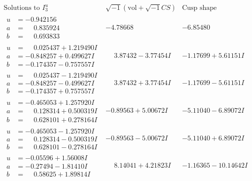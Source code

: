 \documentclass[1p]{elsarticle_modified}
\theoremstyle{definition}
\newcommand{\I}{\sqrt{-1}}
\begin{document}
$$\begin{array}{c|c|c}  
\text{Solutions to }I^u_{3}& \I (\text{vol} + \sqrt{-1}CS) & \text{Cusp shape}\\
 \hline 
\begin{aligned}
u &= -0.942156\phantom{ +0.000000I} \\
a &= \phantom{-}0.835924\phantom{ +0.000000I} \\
b &= \phantom{-}0.693833\phantom{ +0.000000I}\end{aligned}
 & -4.78668\phantom{ +0.000000I} & -6.85480\phantom{ +0.000000I} \\ \hline\begin{aligned}
u &= \phantom{-}0.025437 + 1.219490 I \\
a &= -0.848257 + 0.499627 I \\
b &= -0.174357 - 0.757557 I\end{aligned}
 & \phantom{-}3.87432 - 3.77454 I & -1.17699 + 5.61151 I \\ \hline\begin{aligned}
u &= \phantom{-}0.025437 - 1.219490 I \\
a &= -0.848257 - 0.499627 I \\
b &= -0.174357 + 0.757557 I\end{aligned}
 & \phantom{-}3.87432 + 3.77454 I & -1.17699 - 5.61151 I \\ \hline\begin{aligned}
u &= -0.465053 + 1.257920 I \\
a &= \phantom{-}0.128314 + 0.500319 I \\
b &= \phantom{-}0.628101 + 0.278164 I\end{aligned}
 & -0.89563 + 5.00672 I & -5.11040 - 6.89072 I \\ \hline\begin{aligned}
u &= -0.465053 - 1.257920 I \\
a &= \phantom{-}0.128314 - 0.500319 I \\
b &= \phantom{-}0.628101 - 0.278164 I\end{aligned}
 & -0.89563 - 5.00672 I & -5.11040 + 6.89072 I \\ \hline\begin{aligned}
u &= -0.05596 + 1.56008 I \\
a &= -0.27494 - 1.81410 I \\
b &= \phantom{-}0.58625 + 1.89814 I\end{aligned}
 & \phantom{-}8.14041 + 4.21823 I & -1.16365 - 10.14642 I \\ \hline\begin{aligned}

\end{aligned}
\end{array}$$
\end{document}
